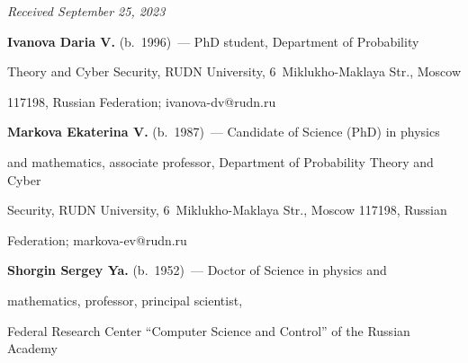 \vspace*{-6pt}





\hfill{\small\textit{Received September 25, 2023}} 










\Contr





\vspace*{-4pt}





\noindent


\textbf{Ivanova Daria V.} (b.\ 1996)~--- PhD student, Department of Probability 


Theory and Cyber Security, RUDN University, 6~Miklukho-Maklaya Str., Moscow 


117198, Russian Federation; \mbox{ivanova-dv@rudn.ru}





\vspace*{3pt}





\noindent


\textbf{Markova Ekaterina V.} (b.\ 1987)~--- Candidate of Science (PhD) in physics 


and mathematics, associate professor, Department of Probability Theory and Cyber 


Security, RUDN University, 6~Miklukho-Maklaya Str., Moscow 117198, Russian 


Federation; \mbox{markova-ev@rudn.ru}





\vspace*{3pt}





\noindent


\textbf{Shorgin Sergey Ya.} (b.\ 1952)~--- Doctor of Science in physics and 


mathematics, professor, principal scientist, 


Federal Research Center ``Computer Science and Control'' of the Russian Academy 


